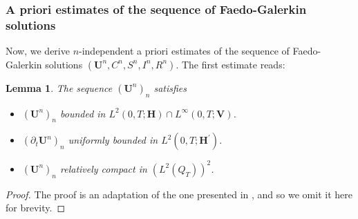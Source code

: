 \documentclass[10pt,number,preprint,times]{elsarticle}
\numberwithin{equation}{section} %
\newtheorem{lem}{Lemma}[section]
\begin{document}
	\subsubsection{A priori estimates of the sequence of Faedo-Galerkin solutions}
	Now, we derive $n$-independent a priori estimates of the sequence of Faedo-Galerkin solutions $(\boldsymbol{U}^n,C^n,S^n,I^n,R^n)$. The first estimate reads:
	\begin{lem}\label{lem-1} 
		The sequence  $(\boldsymbol{U}^n)_n$  satisfies 
		\begin{itemize}
			\item[(i)]\quad $(\boldsymbol{U}^n)_n$  bounded in
			$L^2(0,T;\mathbf{H})\cap L^\infty(0,T;\mathbf{V})$.
			\item[(ii)]\quad 	$(\partial_t \boldsymbol{U}^n)_n$  uniformly bounded in $L^2(0,T; \mathbf{H}^\prime)$.
			\item[(iii)]\quad $(\boldsymbol{U}^n)_n$ relatively compact in $(L^2(Q_T))^2$.		
		\end{itemize}
	\end{lem}
	\begin{proof}
	The proof is an adaptation of the one presented in \cite[Lemma 3]{bendahmane2025mathematical}, and so we omit it here for brevity.
	\end{proof}
	
\end{document}
